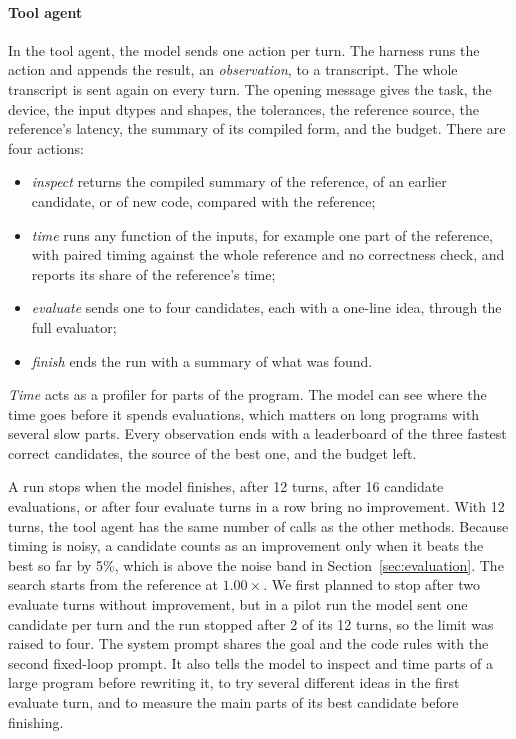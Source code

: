 \documentclass[conference]{IEEEtran}
\begin{document}
\paragraph{Tool agent}
In the tool agent, the model sends one action per turn. The harness runs the
action and appends the result, an \emph{observation}, to a transcript. The
whole transcript is sent again on every turn. The opening message gives the
task, the device, the input dtypes and shapes, the tolerances, the reference
source, the reference's latency, the summary of its compiled form, and the
budget. There are four actions:
\begin{itemize}
  \item \emph{inspect} returns the compiled summary of the reference, of an
    earlier candidate, or of new code, compared with the reference;
  \item \emph{time} runs any function of the inputs, for example one part of
    the reference, with paired timing against the whole reference and no
    correctness check, and reports its share of the reference's time;
  \item \emph{evaluate} sends one to four candidates, each with a one-line
    idea, through the full evaluator;
  \item \emph{finish} ends the run with a summary of what was found.
\end{itemize}
\emph{Time} acts as a profiler for parts of the program. The model can see
where the time goes before it spends evaluations, which matters on long
programs with several slow parts. Every observation ends with a leaderboard
of the three fastest correct candidates, the source of the best one, and the
budget left.

A run stops when the model finishes, after 12 turns, after 16 candidate
evaluations, or after four evaluate turns in a row bring no improvement. With
12 turns, the tool agent has the same number of calls as the other methods.
Because timing is noisy, a candidate counts as an improvement only when it
beats the best so far by 5\%, which is above the noise band in
Section~\ref{sec:evaluation}. The search starts from the reference at
$1.00\times$. We first planned to stop after two evaluate turns without
improvement, but in a pilot run the model sent one candidate per turn and the
run stopped after 2 of its 12 turns, so the limit was raised to four. The
system prompt shares the goal and the code rules with the second fixed-loop
prompt. It also tells the model to inspect and time parts of a large program
before rewriting it, to try several different ideas in the first evaluate
turn, and to measure the main parts of its best candidate before finishing.
\end{document}
